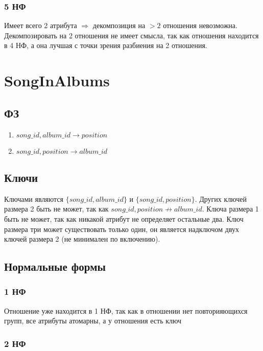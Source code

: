 \documentclass{article}
\begin{document}
\subsubsection{5 НФ}
Имеет всего 2 атрибута $\Rightarrow$ декомпозиция на $> 2$ отношения невозможна. Декомпозировать на 2 отношения не имеет смысла, так как отношения находится в 4 НФ, а она лучшая с точки зрения разбиения на 2 отношения.

\section{SongInAlbums}

\subsection{ФЗ}
\begin{enumerate}
	\item $song\_id, album\_id \rightarrow position$
	\item $song\_id, position \rightarrow album\_id$
\end{enumerate}

\subsection{Ключи}
Ключами являются $\{song\_id, album\_id\}$ и $\{song\_id, position\}$. Других ключей размера 2 быть не может, так как $song\_id, position \not\rightarrow album\_id$. Ключа размера 1 быть не может, так как никакой атрибут не определяет остальные два. Ключ размера три может существовать только один, он является надключом двух ключей размера 2 (не минимален по включению).

\subsection{Нормальные формы}

\subsubsection{1 НФ}

Отношение уже находится в 1 НФ, так как в отношении нет повторияющихся групп, все атрибуты атомарны, а у отношения есть ключ

\subsubsection{2 НФ}
\end{document}
